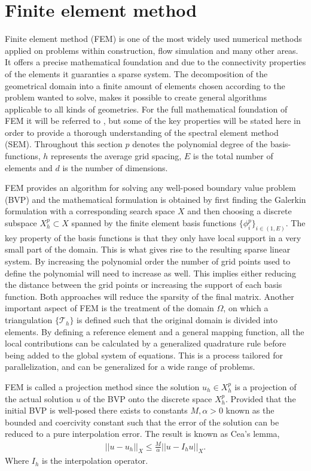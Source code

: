 \section{Finite element method}

Finite element method (FEM) is one of the most widely used numerical methods applied on problems within construction, flow simulation and many 
other areas. It offers a precise mathematical foundation and due to the connectivity properties of the elements 
it guaranties a sparse system. The decomposition of the geometrical domain into a finite amount of elements chosen according to the problem 
wanted to solve, makes it possible to create general algorithms applicable to all kinds of geometries. 
For the full mathematical foundation of FEM it will be referred to \cite{Quarteroni}, but some of the key properties will be stated here
in order to provide a thorough understanding of the spectral element method (SEM). 
Throughout this section $p$ denotes the polynomial degree of the basis-functions, $h$ represents the average grid spacing, $E$ is the total
number of elements and $d$ is the number of dimensions. 

FEM provides an algorithm for solving any well-posed boundary value problem (BVP) and the mathematical 
formulation is obtained by first finding the Galerkin
formulation with a corresponding search space $X$ and then choosing a discrete subspace $X^p_h\subset X$ spanned by the finite element basis functions $\{\phi^p_i\}_{i\in (1,E)}$.
The key property of the basis functions is that they only have local support in a very small part of the domain. 
This is what gives rise to the resulting sparse linear system. 
By increasing the polynomial order the number of grid points used to define the polynomial will need to increase as well.
This implies either reducing the distance between the grid points or increasing the support of each basis function.
Both approaches will reduce the sparsity of the final matrix.
Another important aspect of FEM is the treatment of the domain $\Omega$, 
on which a triangulation $\{\mathcal{T}_h\}$ is defined such that the original domain is divided into elements.
By defining a reference element and a general mapping function, all the local contributions can be calculated by a 
generalized quadrature rule before being added to the global system of equations. This is a process tailored for parallelization, and can 
be generalized for a wide range of problems.

FEM is called a projection method since the solution $u_h\in X_h^p$ is a projection
of the actual solution $u$ of the BVP onto the discrete space $X_h^p$. Provided that the initial BVP is well-posed there exists to 
constants $M,\alpha>0$ known as the bounded and coercivity constant such that the error of the solution can be reduced to a pure 
interpolation error. The result is known as Cea's lemma,  
\begin{align}
    ||u-u_h||_X \leq \frac{M}{\alpha}||u-I_hu||_X.
    \label{eq:Cea}
\end{align}
Where $I_h$ is the interpolation operator. 

